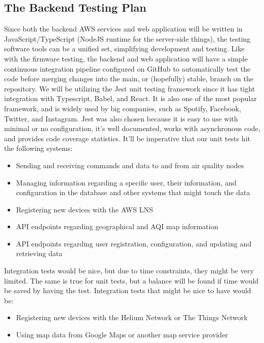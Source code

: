 \subsection{The Backend Testing Plan}
Since both the backend AWS services and web application will be written in
JavaScript/TypeScript (NodeJS runtime for the server-side things), the testing
software tools can be a unified set, simplifying development and testing. Like
with the firmware testing, the backend and web application will have a simple
continuous integration pipeline configured on GitHub to automatically test the
code before merging changes into the main, or (hopefully) stable, branch on the
repository. We will be utilizing the Jest unit testing framework since it has
tight integration with Typescript, Babel, and React. It is also one of the most
popular framework, and is widely used by big companies, such as Spotify,
Facebook, Twitter, and Instagram. Jest was also chosen because it is easy to
use with minimal or no configuration, it's well documented, works with
asynchronous code, and provides code coverage statistics. It'll be imperative
that our unit tests hit the following systems:

\begin{itemize}
  \item Sending and receiving commands and data to and from air quality nodes
  \item Managing information regarding a specific user, their information, and
    configuration in the database and other systems that might touch the data
  \item Registering new devices with the AWS LNS
  \item API endpoints regarding geographical and AQI map information
  \item API endpoints regarding user registration, configuration, and updating
    and retrieving data
\end{itemize}

Integration tests would be nice, but due to time constraints, they might be very
limited. The same is true for unit tests, but a balance will be found if time
would be saved by having the test. Integration tests that might be nice to have
would be:

\begin{itemize}
  \item Registering new devices with the Helium Network or The Things Network
  \item Using map data from Google Maps or another map service provider
\end{itemize}

